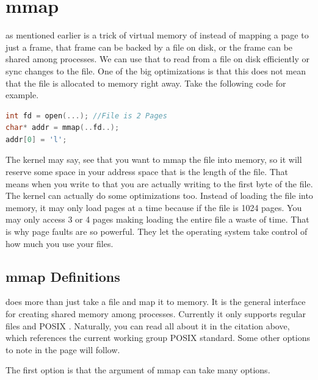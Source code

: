 \section{mmap}

 as mentioned earlier is a trick of virtual memory of instead of mapping a page to just a frame, that frame can be backed by a file on disk, or the frame can be shared among processes.
We can use that to read from a file on disk efficiently or sync changes to the file.
One of the big optimizations is that this does not mean that the file is allocated to memory right away.
Take the following code for example.

\begin{lstlisting}[language=C]
int fd = open(...); //File is 2 Pages
char* addr = mmap(..fd..);
addr[0] = 'l';
\end{lstlisting}

The kernel may say, see that you want to mmap the file into memory, so it will reserve some space in your address space that is the length of the file.
That means when you write to  that you are actually writing to the first byte of the file.
The kernel can actually do some optimizations too.
Instead of loading the file into memory, it may only load pages at a time because if the file is 1024 pages.
You may only access 3 or 4 pages making loading the entire file a waste of time.
That is why page faults are so powerful.
They let the operating system take control of how much you use your files.

\subsection{mmap Definitions}

 does more than just take a file and map it to memory.
It is the general interface for creating shared memory among processes.
Currently it only supports regular files and POSIX  \cite{mmap_2018}.
Naturally, you can read all about it in the citation above, which references the current working group POSIX standard.
Some other options to note in the page will follow.

The first option is that the  argument of mmap can take many options.

